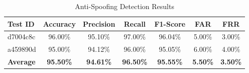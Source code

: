 \begin{table}[htbp]
\centering
\caption{Anti-Spoofing Detection Results}
\label{tab:antispoofing_results}
\begin{tabular}{|l|c|c|c|c|c|c|}
\hline
\textbf{Test ID} & \textbf{Accuracy} & \textbf{Precision} & \textbf{Recall} & \textbf{F1-Score} & \textbf{FAR} & \textbf{FRR} \\
\hline
d7004c8c & 96.00\% & 95.10\% & 97.00\% & 96.04\% & 5.00\% & 3.00\% \\
\hline
a459890d & 95.00\% & 94.12\% & 96.00\% & 95.05\% & 6.00\% & 4.00\% \\
\hline
\hline
\textbf{Average} & \textbf{95.50\%} & \textbf{94.61\%} & \textbf{96.50\%} & \textbf{95.55\%} & \textbf{5.50\%} & \textbf{3.50\%} \\
\hline
\end{tabular}
\end{table}